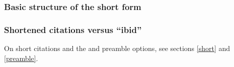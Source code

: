 \documentclass[11pt,letterpaper,oneside]{article}
\begin{document}
\setcounter{subsubsection}{29}
\subsubsection{Basic structure of the short form}
\label{14.30}

\begin{citebib}
\item \cite[24--25]{morley1995}
\item \cite{schwartz1992}
\item \cite{kaiser1964}
\item \cite[43]{morley1995}
\item \cite[138]{schwartz1992}
\item \cite[189--90]{kaiser1964}
\end{citebib}

\setcounter{subsubsection}{33}
\subsubsection{Shortened citations versus ``ibid''}
\label{14.34}

On short citations and the  and  preamble
options, see sections \ref{short} and \ref{preamble}.

\begin{citenobib}
\item \cite[3]{morrison2004a}
\item \cite[18]{morrison2004a}
\item \cite[18]{morrison2004a}
\item \cite[24--26]{morrison2004a}
\item \cite[401-2]{morrison2004b}
\item \cite[433]{morrison2004b}
\item \cite[37--38]{diaz2007}
\item \cite[403]{morrison2004b}
\item \cite[152]{diaz2007}
\item \cite[201-2]{diaz2007}
\item \cites[240]{morrison2004b}[32]{morrison2004a}
 \item \cite[33]{morrison2004a}
\end{citenobib}
\end{document}
